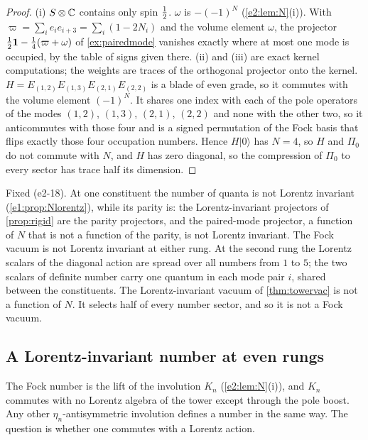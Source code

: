 \begin{proof}
(i) $S\otimes\mathbb{C}$ contains only spin $\tfrac12$. $\omega$ is $-(-1)^N$ (\cref{e2:lem:N}(i)). With $\varpi=\sum_ie_ie_{i+3}=\sum_i(1-2N_i)$ and
the volume element $\omega$, the projector $\tfrac12\mathbf 1-\tfrac14(\varpi+\omega)$ of \cref{ex:pairedmode} vanishes exactly where at most one mode is occupied, by the
table of signs given there. (ii) and (iii) are exact kernel computations; the weights are traces of the orthogonal projector onto the
kernel. $H=E_{(1,2)}E_{(1,3)}E_{(2,1)}E_{(2,2)}$ is a blade of even grade, so it commutes with the volume element $(-1)^N$. It shares one
index with each of the pole operators of the modes $(1,2)$, $(1,3)$, $(2,1)$, $(2,2)$ and none with the other two, so it anticommutes with
those four and is a signed permutation of the Fock basis that flips exactly those four occupation numbers. Hence $H|0\rangle$ has $N=4$, so
$H$ and $\Pi_0$ do not commute with $N$, and $H$ has zero diagonal, so the compression of $\Pi_0$ to every sector has trace half its
dimension.
\end{proof}

Fixed (e2-18). At one constituent the number of quanta is not Lorentz invariant (\cref{e1:prop:Nlorentz}), while its parity is: the
Lorentz-invariant projectors of \cref{prop:rigid} are the parity projectors, and the paired-mode projector, a function of $N$
that is not a function of the parity, is not Lorentz invariant. The Fock vacuum is not Lorentz invariant at either rung. At the second rung the Lorentz scalars of the diagonal action are spread
over all numbers from $1$ to $5$; the two scalars of definite number carry one quantum in each mode pair $i$, shared between the
constituents. The Lorentz-invariant vacuum of \cref{thm:towervac} is not a function of $N$. It selects half of every number sector,
and so it is not a Fock vacuum.

\subsection{\texorpdfstring{A Lorentz-invariant number at even rungs}{A Lorentz-invariant number at even rungs}}
\label{e2:sec:invnumber}

The Fock number is the lift of the involution $K_n$ (\cref{e2:lem:N}(i)), and $K_n$ commutes with no Lorentz algebra of the tower except
through the pole boost. Any other $\eta_n$-antisymmetric involution defines a number in the same way. The question is whether one commutes
with a Lorentz action.

